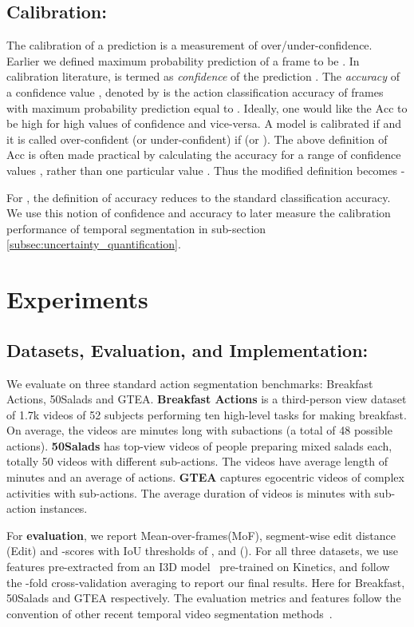 \documentclass[10pt,twocolumn,letterpaper]{article}
\newcommand{\acc}{\ensuremath{\text{Acc}}}
\begin{document}
\subsection{Calibration:}\label{subsec:calibration_notation}
The calibration of a prediction is a measurement of over/under-confidence. Earlier we defined maximum probability prediction of a frame  to be . In calibration literature,  is termed as \textit{confidence} of the prediction . The \textit{accuracy} of a confidence value , denoted by  is the action classification accuracy of frames with maximum probability prediction  equal to . Ideally, one would like the \acc{} to be high for high values of confidence and vice-versa. A model is calibrated if  and it is called over-confident (or under-confident) if  (or ). 
The above definition of \acc{} is often made practical by calculating the accuracy for a range of confidence values , rather than one particular value . Thus the modified definition becomes -

For , the definition of accuracy reduces to the standard classification accuracy. We use this notion of confidence and accuracy to later measure the calibration performance of temporal segmentation in sub-section \ref{subsec:uncertainty_quantification}.

\section{Experiments}\label{sec:results}

\subsection{Datasets, Evaluation, and Implementation:} 
We evaluate on three standard action segmentation benchmarks: Breakfast Actions\cite{kuehne2014language}, 50Salads\cite{stein2013combining} and GTEA\cite{gtea-fathi2011learning}.
\textbf{Breakfast Actions} is a third-person view dataset of 1.7k videos of 52 subjects performing ten high-level tasks for making breakfast.  
On average, the videos are  minutes long with  subactions (a total of 48 possible actions).
\textbf{50Salads} has top-view videos of  people preparing  mixed salads each, totally 50 videos with  different sub-actions. 
The videos have average length of  minutes and an average of  actions. 
\textbf{GTEA} captures  egocentric videos of  complex activities 
with  sub-actions. The average duration of videos is  minutes with  sub-action instances. 

For \textbf{evaluation}, we report Mean-over-frames(MoF), segment-wise edit distance (Edit) and -scores with IoU thresholds of ,  and (). For all three datasets, we use features pre-extracted from an I3D model~\cite{carreira2017quo} pre-trained on Kinetics, and follow the -fold cross-validation averaging to report our final results. Here  for Breakfast, 50Salads and GTEA respectively. 
The evaluation metrics and features follow the convention of other recent temporal video segmentation methods~\cite{sener2020temporal, li2020ms, wang2020boundary, ishikawa2021alleviating}. 
\end{document}
